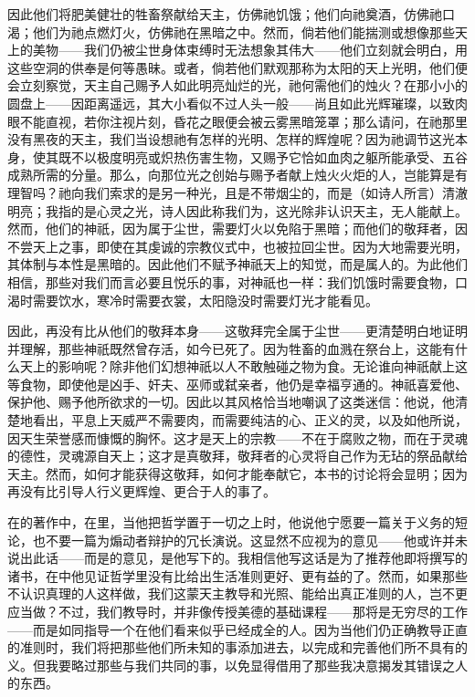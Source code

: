 因此他们将肥美健壮的牲畜祭献给天主，仿佛祂饥饿；他们向祂奠酒，仿佛祂口渴；他们为祂点燃灯火，仿佛祂在黑暗之中。然而，倘若他们能揣测或想像那些天上的美物——我们仍被尘世身体束缚时无法想象其伟大——他们立刻就会明白，用这些空洞的供奉是何等愚昧。或者，倘若他们默观那称为太阳的天上光明，他们便会立刻察觉，天主自己赐予人如此明亮灿烂的光，祂何需他们的烛火？在那小小的圆盘上——因距离遥远，其大小看似不过人头一般——尚且如此光辉璀璨，以致肉眼不能直视，若你注视片刻，昏花之眼便会被云雾黑暗笼罩；那么请问，在祂那里没有黑夜的天主，我们当设想祂有怎样的光明、怎样的辉煌呢？因为祂调节这光本身，使其既不以极度明亮或炽热伤害生物，又赐予它恰如血肉之躯所能承受、五谷成熟所需的分量。那么，向那位光之创始与赐予者献上烛火火炬的人，岂能算是有理智吗？祂向我们索求的是另一种光，且是不带烟尘的，而是（如诗人所言）清澈明亮；我指的是心灵之光，诗人因此称我们为，这光除非认识天主，无人能献上。然而，他们的神祇，因为属于尘世，需要灯火以免陷于黑暗；而他们的敬拜者，因不尝天上之事，即使在其虔诚的宗教仪式中，也被拉回尘世。因为大地需要光明，其体制与本性是黑暗的。因此他们不赋予神祇天上的知觉，而是属人的。为此他们相信，那些对我们而言必要且悦乐的事，对神祇也一样：我们饥饿时需要食物，口渴时需要饮水，寒冷时需要衣裳，太阳隐没时需要灯光才能看见。\par

因此，再没有比从他们的敬拜本身——这敬拜完全属于尘世——更清楚明白地证明并理解，那些神祇既然曾存活，如今已死了。因为牲畜的血溅在祭台上，这能有什么天上的影响呢？除非他们幻想神祇以人不敢触碰之物为食。无论谁向神祇献上这等食物，即使他是凶手、奸夫、巫师或弑亲者，他仍是幸福亨通的。神祇喜爱他、保护他、赐予他所欲求的一切。因此以其风格恰当地嘲讽了这类迷信：他说，他清楚地看出，平息上天威严不需要肉，而需要纯洁的心、正义的灵，以及如他所说，因天生荣誉感而慷慨的胸怀。这才是天上的宗教——不在于腐败之物，而在于灵魂的德性，灵魂源自天上；这才是真敬拜，敬拜者的心灵将自己作为无玷的祭品献给天主。然而，如何才能获得这敬拜，如何才能奉献它，本书的讨论将会显明；因为再没有比引导人行义更辉煌、更合于人的事了。\par

在的著作中，在里，当他把哲学置于一切之上时，他说他宁愿要一篇关于义务的短论，也不要一篇为煽动者辩护的冗长演说。这显然不应视为的意见——他或许并未说出此话——而是的意见，是他写下的。我相信他写这话是为了推荐他即将撰写的诸书，在中他见证哲学里没有比给出生活准则更好、更有益的了。然而，如果那些不认识真理的人这样做，我们这蒙天主教导和光照、能给出真正准则的人，岂不更应当做？不过，我们教导时，并非像传授美德的基础课程——那将是无穷尽的工作——而是如同指导一个在他们看来似乎已经成全的人。因为当他们仍正确教导正直的准则时，我们将把那些他们所未知的事添加进去，以完成和完善他们所不具有的义。但我要略过那些与我们共同的事，以免显得借用了那些我决意揭发其错误之人的东西。\par

